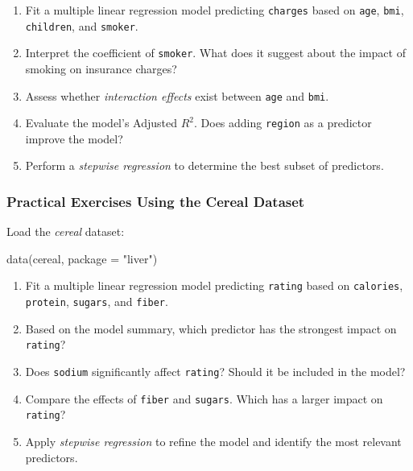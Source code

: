 \documentclass[
  11pt,
]{book}
\makeatletter
\newenvironment{Shaded}{}{}
\newcommand{\AttributeTok}[1]{#1}
\newcommand{\FunctionTok}[1]{#1}
\newcommand{\NormalTok}[1]{#1}
\newcommand{\StringTok}[1]{\textcolor[rgb]{0.39,0.39,0.39}{#1}}
\providecommand{\tightlist}{%
  \setlength{\itemsep}{0pt}\setlength{\parskip}{0pt}}
\newenvironment{kframe}{%
\medskip{}
\setlength{\fboxsep}{.8em}
 \def\at@end@of@kframe{}%
 \ifinner\ifhmode%
  \def\at@end@of@kframe{\end{minipage}}%
  \begin{minipage}{\columnwidth}%
 \fi\fi%
 \def\FrameCommand##1{\hskip\@totalleftmargin \hskip-\fboxsep
 \colorbox{shadecolor}{##1}\hskip-\fboxsep
     \hskip-\linewidth \hskip-\@totalleftmargin \hskip\columnwidth}%
 \MakeFramed {\advance\hsize-\width
   \@totalleftmargin\z@ \linewidth\hsize
   \@setminipage}}%
 {\par\unskip\endMakeFramed%
 \at@end@of@kframe}
\renewenvironment{Shaded}{\begin{kframe}}{\end{kframe}}
\theoremstyle{definition}
\theoremstyle{definition}
\theoremstyle{definition}
\theoremstyle{definition}
\theoremstyle{remark}
\makeatother
\begin{document}
\begin{enumerate}
\def\labelenumi{\arabic{enumi}.}
\setcounter{enumi}{14}
\tightlist
\item
  Fit a multiple linear regression model predicting \texttt{charges} based on \texttt{age}, \texttt{bmi}, \texttt{children}, and \texttt{smoker}.\\
\item
  Interpret the coefficient of \texttt{smoker}. What does it suggest about the impact of smoking on insurance charges?\\
\item
  Assess whether \emph{interaction effects} exist between \texttt{age} and \texttt{bmi}.\\
\item
  Evaluate the model's Adjusted \(R^2\). Does adding \texttt{region} as a predictor improve the model?\\
\item
  Perform a \emph{stepwise regression} to determine the best subset of predictors.
\end{enumerate}

\subsubsection*{Practical Exercises Using the Cereal Dataset}\label{practical-exercises-using-the-cereal-dataset}


Load the \emph{cereal} dataset:

\begin{Shaded}
\begin{Highlighting}[]
\FunctionTok{data}\NormalTok{(cereal, }\AttributeTok{package =} \StringTok{"liver"}\NormalTok{)}
\end{Highlighting}
\end{Shaded}

\begin{enumerate}
\def\labelenumi{\arabic{enumi}.}
\setcounter{enumi}{19}
\tightlist
\item
  Fit a multiple linear regression model predicting \texttt{rating} based on \texttt{calories}, \texttt{protein}, \texttt{sugars}, and \texttt{fiber}.\\
\item
  Based on the model summary, which predictor has the strongest impact on \texttt{rating}?\\
\item
  Does \texttt{sodium} significantly affect \texttt{rating}? Should it be included in the model?\\
\item
  Compare the effects of \texttt{fiber} and \texttt{sugars}. Which has a larger impact on \texttt{rating}?\\
\item
  Apply \emph{stepwise regression} to refine the model and identify the most relevant predictors.
\end{enumerate}
\end{document}
